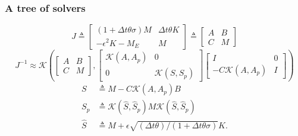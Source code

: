 \documentclass[presentation]{beamer}
\begin{document}
\begin{frame}
  \frametitle{A tree of solvers}
  \footnotesize
  \begin{equation*}
    J \triangleq \begin{bmatrix}
      (1 + \Delta t \theta \sigma)M  & \Delta t\theta K \\
      -\epsilon^2 K - M_E & M
    \end{bmatrix} \triangleq
    \begin{bmatrix}
      A & B \\
      C & M
    \end{bmatrix}
  \end{equation*}
  \begin{equation*}
    J^{-1} \approx \mathcal{K}\left(\begin{bmatrix}
        A  & B \\
        C & M
      \end{bmatrix},
      \begin{bmatrix}
        \mathcal{K}(A, A_p) & 0\\
        0 & \mathcal{K}(S, S_p)
      \end{bmatrix}
      \begin{bmatrix}
        I & 0\\
        -C\mathcal{K}(A, A_p) & I
      \end{bmatrix}\right)
  \end{equation*}
  \begin{align*}
    S &\triangleq M - C\mathcal{K}(A, A_p)B\\
    S_p &\triangleq \mathcal{K}(\hat{S}, \hat{S}_p)M\mathcal{K}(\hat{S}, \hat{S}_p)\\
    \hat{S} &\triangleq M + \epsilon\sqrt{(\Delta t \theta)/(1+\Delta t \theta\sigma)} K.
  \end{align*}
\end{frame}
\end{document}
